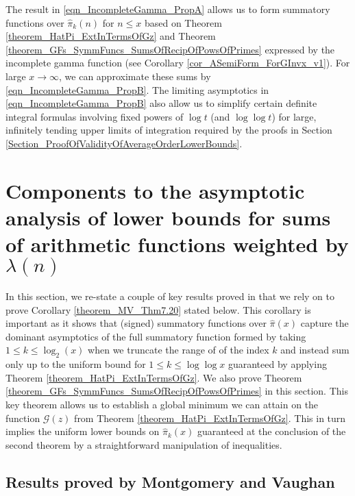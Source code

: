 \documentclass[11pt,reqno,a4letter]{article}
\numberwithin{figure}{section}
\numberwithin{table}{section}
\theoremstyle{plain}
\numberwithin{theorem}{section}
\theoremstyle{definition}
\begin{document}
The result in \eqref{eqn_IncompleteGamma_PropA} allows us to form summatory 
functions over $\widehat{\pi}_k(n)$ for $n \leq x$ based on 
Theorem \ref{theorem_HatPi_ExtInTermsOfGz} and 
Theorem \ref{theorem_GFs_SymmFuncs_SumsOfRecipOfPowsOfPrimes} 
expressed by the incomplete gamma function 
(see Corollary \ref{cor_ASemiForm_ForGInvx_v1}). 
For large $x \rightarrow \infty$, we can approximate these sums by 
\eqref{eqn_IncompleteGamma_PropB}. 
The limiting asymptotics in \eqref{eqn_IncompleteGamma_PropB} also allow us to 
simplify certain definite integral formulas involving fixed powers of $\log t$ (and $\log\log t$) 
for large, infinitely tending upper limits of integration required by the proofs in 
Section \ref{Section_ProofOfValidityOfAverageOrderLowerBounds}. 

\newpage 
\section{Components to the asymptotic analysis of lower bounds for 
         sums of arithmetic functions weighted by $\lambda(n)$} 
\label{Section_MVCh7_GzBounds} 

In this section, we re-state a couple of key results proved in \cite[\S 7.4]{MV} that we rely on 
to prove Corollary \ref{theorem_MV_Thm7.20} stated below. This corollary is important as it shows 
that (signed) summatory functions over $\widehat{\pi}(x)$ 
capture the dominant asymptotics of the full summatory function formed by taking $1 \leq k \leq \log_2(x)$ when 
we truncate the range of of the index $k$ and instead sum only up to the uniform bound for 
$1 \leq k \leq \log\log x$ guaranteed by applying 
Theorem \ref{theorem_HatPi_ExtInTermsOfGz}. 
We also prove 
Theorem \ref{theorem_GFs_SymmFuncs_SumsOfRecipOfPowsOfPrimes} in this section. 
This key theorem allows us to establish a global minimum we can attain on the function $\mathcal{G}(z)$ from 
Theorem \ref{theorem_HatPi_ExtInTermsOfGz}. 
This in turn implies the uniform lower bounds on $\widehat{\pi}_k(x)$ guaranteed at the 
conclusion of the second theorem by a straightforward manipulation of inequalities. 

\subsection{Results proved by Montgomery and Vaughan} 
\label{subSection_MVPrereqResultStmts} 
\end{document}
